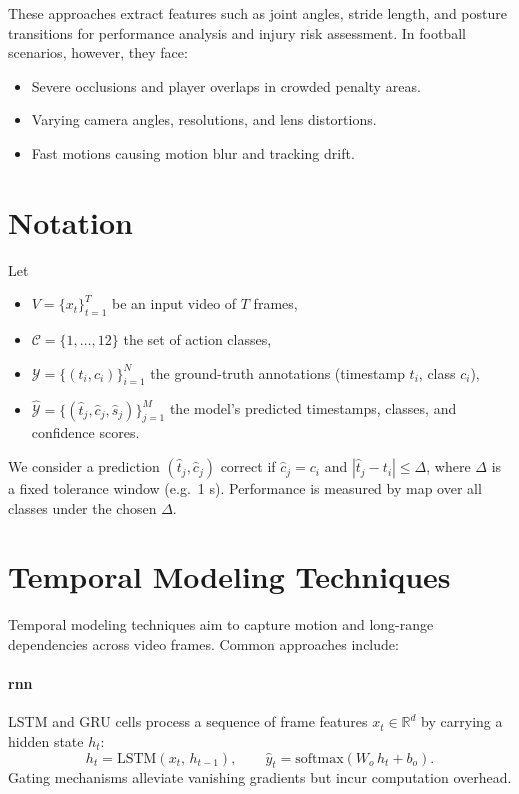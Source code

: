 These approaches extract features such as joint angles, stride length, and posture transitions for performance analysis and injury risk assessment. In football scenarios, however, they face:

\begin{itemize}
    \item Severe occlusions and player overlaps in crowded penalty areas.
    \item Varying camera angles, resolutions, and lens distortions.
    \item Fast motions causing motion blur and tracking drift\cite{survey_of_survey}.
\end{itemize} 


\section{Notation}
\label{sec:notation}
Let
\begin{itemize}
  \item $V=\{x_t\}_{t=1}^T$ be an input video of $T$ frames,
  \item $\mathcal{C}=\{1,\dots,12\}$ the set of action classes,
  \item $\mathcal{Y}=\{(t_i,c_i)\}_{i=1}^N$ the ground-truth annotations (timestamp $t_i$, class $c_i$),
  \item $\hat{\mathcal{Y}}=\{(\hat t_j,\hat c_j,\hat s_j)\}_{j=1}^M$ the model's predicted timestamps, classes, and confidence scores.
\end{itemize}
We consider a prediction $(\hat t_j,\hat c_j)$ correct if $\hat c_j=c_i$ and $|\hat t_j - t_i|\le\Delta$, where $\Delta$ is a fixed tolerance window (e.g.\ 1 s). Performance is measured by \acrfull{map} over all classes under the chosen $\Delta$.

\section{Temporal Modeling Techniques}
\label{sec:temporal_models}

Temporal modeling techniques aim to capture motion and long-range dependencies across video frames. Common approaches include: 

\paragraph{\acrfull{rnn}}  
LSTM and GRU cells process a sequence of frame features \(x_t\in\mathbb{R}^d\) by carrying a hidden state \(h_t\):
\[
h_t = \mathrm{LSTM}(x_t,\,h_{t-1}), 
\qquad
\hat y_t = \mathrm{softmax}(W_o\,h_t + b_o).
\]
Gating mechanisms alleviate vanishing gradients but incur computation overhead.

